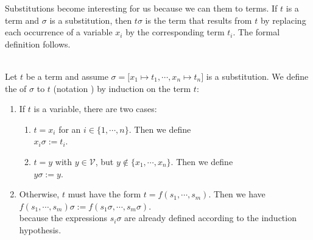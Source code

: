 \noindent
Substitutions become interesting for us because we can  them to terms.  If $t$ is a
term and $\sigma$ is a substitution, then $t\sigma$ is the term that results from $t$ by replacing each
occurrence of a variable $x_i$ by the corresponding term $t_i$.  The formal definition follows. 
\begin{Definition}
\hspace*{\fill} \\
Let $t$ be a term and assume $\sigma = \bigl[ x_1 \mapsto t_1, \cdots, x_n \mapsto t_n \bigr]$
is a substitution.  We define the  of $\sigma$ to $t$
(notation )  by induction on the term $t$: 
\begin{enumerate}
\item If $t$ is a variable, there are two cases:
  \begin{enumerate}
  \item $t = x_i$ for an $i\in\{1,\cdots,n\}$.  Then we define 
        \\[0.2cm]
        \hspace*{1.3cm}
        $x_i\sigma := t_i$.
  \item $t = y$ with $y\in\mathcal{V}$, but $y \not\in \{x_1,\cdots,x_n\}$. Then we define 
        \\[0.2cm]
        \hspace*{1.3cm}
        $y\sigma := y$.
  \end{enumerate}
\item Otherwise, $t$ must have the form $t= f(s_1,\cdots,s_m)$. Then we have \\[0.2cm]
      \hspace*{1.3cm} $f(s_1, \cdots, s_m)\sigma := f(s_1\sigma, \cdots, s_m\sigma)$. \\[0.2cm]
      because the expressions $s_i\sigma$ are already defined according to the induction hypothesis.
      \eox
\end{enumerate}
\end{Definition}

